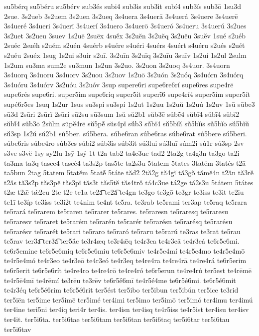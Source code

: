{su5bérq
su5béru
su5bérv
sub3és
subi4
sub3is
sub3it
subí4
sub3ís
sub3ō
1su3d
2sue.
3s2ueb
3s2uem
3s2uen
3s2ueq
3s4uera
3s4uerā
3s4uerá
3s4uere
3s4uerē
3s4ueré
3s4ueri
3s4uerī
3s4uerí
3s4uero
3s4uerō
3s4ueró
3s4ueru
3s4uerú
3s2ues
3s2uet
3s2ueu
3suev
1s2uē
2suēx
4suḗx
3s2uĕn
3s2uĕq
3s2uĕu
3suĕv
1sué
s2uéb
2suéc
2suéh
s2uém
s2uén
4suérb
s4uére
s4uéri
4suérs
4suért
s4uéru
s2ués
s2uét
s2uéu
2suéx
1sug
1s2ui
s3uir
s2uī.
3s2uīn
3s2uīq
3s2uīu
3suīv
1s2uí
1s2ul
2sulm
1s2um
su3ma
sum2e
su3mun
1s2un
3s2uo.
3s2uon
3s2uoq
3s4uor.
3s4uorn
3s4uorq
3s4uoru
3s4uorv
3s2uou
3s2uov
1s2uō
3s2uón
3s2uóq
3s4uórn
3s4uórq
3s4uóru
3s4uórv
3s2uóu
3s2uóv
3sup
supere6ri
supe6re6rí
supe6res
supe4rē
supe6rés
supe6ri.
super5im
supe6riq
super5it
superī́6
supe4rí4
super5ím
super5ít
supé6r5es
1suq
1s2ur
1sus
su3spi
su3spí
1s2ut
1s2uu
1s2uŭ
1s2uú
1s2uv
1sū
sūbe3
sū3d
2sūri
2sūrĭ
2sūrí
sū2su
sū3sum
1sŭ
sŭ2b1
sŭb3ē
sŭbḗ4
sŭbī4
sŭbī́4
sŭbĭ2
sŭbĭ́4
sŭb3ō
2sŭlm
sŭpĕ4rē
sŭ5pĕ́
sŭs4pĭ
sŭ́b3
sŭ́bĭ4
sŭ́5bĭă
sŭ́5bĭīs
sŭ́5bĭō
sŭ́5bĭŭ
sŭ́3sp
1s2ú
sú2b1
sú5ber.
sú5bera.
súbe6ran
súbe6ras
súbe6rat
sú5bere
sú5beri.
súbe6ris
súbe4ro
súb3es
súbi2
súb3is
súb3it
sú3lui
sú3luī
súm2i
sú1r
sú3sp
2sv
s3ve
s3vĕ
1sy
sy2lu
1sȳ
1sý
1t
t2a
tab2
ta4c3ue
tad2
2ta2g
ta4g3n
ta3go
ta2i
ta3ma
ta3q
tasce4
tascé4
ta3s2p
tas5te
ta2s3u
5tatem
5tates
3tatém
3tatés
t2ā
tā5bun
2tāg
5tātem
5tātĕm
5tātĕ́
5tā́tē
tăd2
2tă2g
tă4gĭ
tă3gŏ
tămĕ4n
t2ăn
tă3rĕ
t2ăs
tă3s2p
tăs3pĕ
tăs3pĭ
tăs3t
tăs5tĕ
tăs4trŏ
tá4c3ue
tá2ge
tá2s3u
5tátem
5tátes
t2æ
t2ǣ
tǽ2cu
2tc
t2e
te1a
te2a͞
te2a͡
te4gn
te3go
te3gō
te3gr
te3iss
te3it
te2iu
te1ī
te3íp
te3íss
te3í2t
te4nim
te4nt
te5ra.
te3rab
te5rami
ter3ap
te5raq
te5rara
te5rará
te5rarem
te5raren
te5rarer
te5rares.
te5raresn
te5raresq
te5raresu
te5raresv
te5raret
te5rarém
te5rarén
te5rarér
te5rarésn
te5rarésq
te5rarésu
te5rarésv
te5rarét
te5rari
te5raro
te5raró
te5raru
te5rarú
te3ras
te3rat
te5rau
te5rav
ter3a͞
ter3a͡
ter5ā́c
te3r4æq
te3r4ǣq
te4r3ea
te4r3eā
te4r3eá
te6r5e6mi.
te6r5emine
te6r5e6miq
te6r5e6miu
te6r5e6miv
te4r5e4mí
te4r5e4mo
te4r5e4mō
te4r5e4mó
te4r3eo
te4r3eō
te4r3eó
te4r3eq
te4re4ra
te4re4rā
te4re4rá
te6r5erim
te6r5erit
te6r5e6rít
te4re4ro
te4re4rō
te4re4ró
te6r5erun
te4re4rú
ter5est
te4rēmē
te4r5ē4mī
te4rēmí
te3rēu
te3rēv
te6r5ḗ6mī
te4r5é4me
te6r5é6mi.
te6r5é6mit
te4r3éq
te6r5é6rim
te6r5é6rit
ter5ést
ter5ibo
ter5ibun
ter5ibún
ter5ice
te3rid
ter5iēn
ter5ime
ter5imē
ter5imé
ter4imi
ter5imo
ter5imō
ter5imó
ter4imu
ter4imú
ter4ine
teri5ni
ter4iq
teri4r
ter4is.
ter4isn
ter4isq
te4r5iss
te4r5ist
ter4isu
ter4isv
ter4it.
ter5i6ta.
ter5i6tae
ter5i6tam
ter5i6tan
ter5i6taq
ter5i6tar
ter5i6tau
ter5i6tav
}
